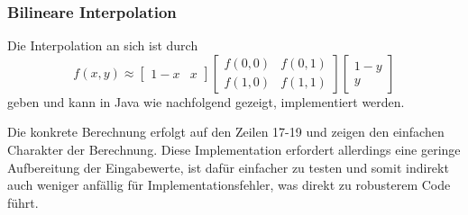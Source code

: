 \subsubsection{Bilineare Interpolation}
Die Interpolation an sich ist durch 
\begin{equation}
f(x,y) \approx \begin{bmatrix} 1-x & x \end{bmatrix} \begin{bmatrix}
f(0,0) & f(0,1) \\ f(1,0) & f(1,1) \end{bmatrix} \begin{bmatrix} 1 - y
\\ y \end{bmatrix}
\label{eq:bilineareinterpolation}
\end{equation}
geben und kann in Java wie nachfolgend gezeigt, implementiert werden.

 
Die konkrete Berechnung erfolgt auf den Zeilen 17-19 und zeigen den
einfachen Charakter der Berechnung. Diese Implementation erfordert
allerdings eine geringe Aufbereitung der Eingabewerte, ist dafür
einfacher zu testen und somit indirekt auch weniger anfällig für
Implementationsfehler, was direkt zu robusterem Code führt.
